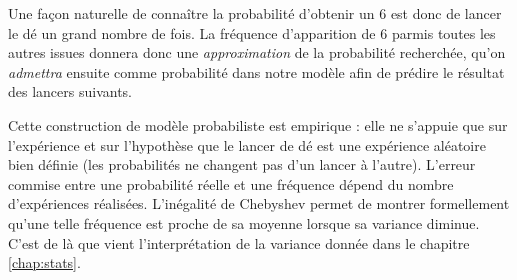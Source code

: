 Une façon naturelle de connaître la probabilité d'obtenir un $6$ est donc de lancer le dé un grand nombre de fois.
La fréquence d'apparition de $6$ parmis toutes les autres issues donnera donc une \emph{approximation} de la probabilité recherchée, qu'on \emph{admettra} ensuite comme probabilité dans notre modèle afin de prédire le résultat des lancers suivants.

Cette construction de modèle probabiliste est empirique : elle ne s'appuie que sur l'expérience et sur l'hypothèse que le lancer de dé est une expérience aléatoire bien définie (les probabilités ne changent pas d'un lancer à l'autre).
L'erreur commise entre une probabilité réelle et une fréquence dépend du nombre d'expériences réalisées.
L'inégalité de Chebyshev permet de montrer formellement qu'une telle fréquence est proche de sa moyenne lorsque sa variance diminue.
C'est de là que vient l'interprétation de la variance donnée dans le chapitre \ref{chap:stats}.


